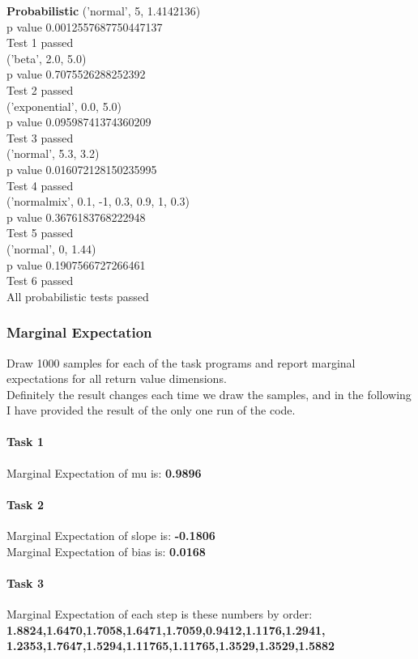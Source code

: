 \documentclass{article}
\def\blu#1{{\color{blu}#1}}
\begin{document}
\textbf{Probabilistic}
('normal', 5, 1.4142136)\\
p value 0.0012557687750447137\\
Test 1 passed\\
('beta', 2.0, 5.0)\\
p value 0.7075526288252392\\
Test 2 passed\\
('exponential', 0.0, 5.0)\\
p value 0.09598741374360209\\
Test 3 passed\\
('normal', 5.3, 3.2)\\
p value 0.016072128150235995\\
Test 4 passed\\
('normalmix', 0.1, -1, 0.3, 0.9, 1, 0.3)\\
p value 0.3676183768222948\\
Test 5 passed\\
('normal', 0, 1.44)\\
p value 0.1907566727266461\\
Test 6 passed\\
All probabilistic tests passed\\
\subsubsection{Marginal Expectation}
\blu{Draw 1000 samples for each of the task programs and report marginal expectations for all return value dimensions.}\\
Definitely  the result changes each time we draw the samples, and in the following I have provided the result of the only one run of the code.
\paragraph{Task 1}
Marginal Expectation of mu is: \textbf{0.9896}
\paragraph{Task 2}
Marginal Expectation of slope is: \textbf{-0.1806}\\
Marginal Expectation of bias is: \textbf{0.0168}
\paragraph{Task 3}
Marginal Expectation of each step is these numbers by order:\\ \textbf{1.8824,1.6470,1.7058,1.6471,1.7059,0.9412,1.1176,1.2941,\\1.2353,1.7647,1.5294,1.11765,1.11765,1.3529,1.3529,1.5882}
\end{document}
